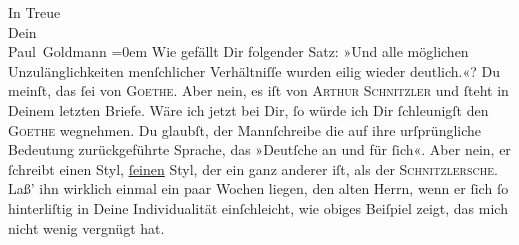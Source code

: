 \pstart
           In Treue {\\[\baselineskip]}Dein {\\[\baselineskip]}\spacefill\mbox{Paul Goldmann}\pend
           \leftskip=0em{}
\pstart
           \noindent{}Wie gefällt Dir folgender Satz: »Und alle möglichen Unzulänglichkeiten
                  menſchlicher Verhältniſſe wurden eilig wieder deutlich.«? Du meinſt, das{ }ſei von
                     \textsc{Goethe}. Aber nein, es iſt von \textsc{Arthur Schnitzler} und{ }ſteht
                  in Deinem letzten Briefe. Wäre ich jetzt bei Dir,{ }ſo würde ich Dir{ }ſchleunigſt den
                     \textsc{Goethe} wegnehmen. Du glaubſt, der Mannſchreibe  die auf ihre urſprüngliche Bedeutung zurückgeführte Sprache, das »Deutſche
                  an {\pb}und für{ }ſich«. Aber nein, er{ }ſchreibt einen
                  Styl, \uline{ſeinen} Styl, der ein ganz anderer iſt, als
                  der \textsc{Schnitzlersche}. Laß’ ihn wirklich einmal ein paar
                  Wochen liegen, den alten Herrn, wenn er{ }ſich{ }ſo hinterliſtig in Deine
                  Individualität einſchleicht, wie obiges Beiſpiel zeigt, das mich nicht wenig
                  vergnügt hat.\pend
           \endnumbering{}  \newcommand{\dateiname}{L02748}\newcommand{\titel}{Paul Goldmann an Arthur Schnitzler, 23. 9. [1895]}\newcommand{\editorInnen}{Martin Anton Müller und Laura Untner}

